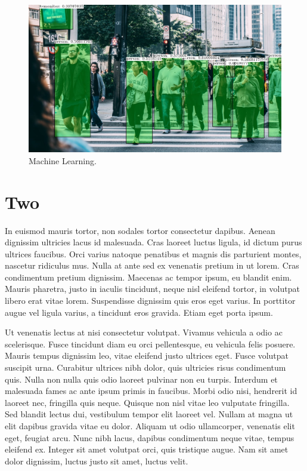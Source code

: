 \begin{spacing}{1.5}
\begin{figure}[ht]
\centering
\includegraphics[width=5in, fbox]{Chapter1/opencv.png}
\caption{Machine Learning.}
\label{fig:opencvexample} 
\end{figure}

\section{Two}
In euismod mauris tortor, non sodales tortor consectetur dapibus. Aenean dignissim ultricies lacus id malesuada. Cras laoreet luctus ligula, id dictum purus ultrices faucibus. Orci varius natoque penatibus et magnis dis parturient montes, nascetur ridiculus mus. Nulla at ante sed ex venenatis pretium in ut lorem. Cras condimentum pretium dignissim. Maecenas ac tempor ipsum, eu blandit enim. Mauris pharetra, justo in iaculis tincidunt, neque nisl eleifend tortor, in volutpat libero erat vitae lorem. Suspendisse dignissim quis eros eget varius. In porttitor augue vel ligula varius, a tincidunt eros gravida. Etiam eget porta ipsum.

Ut venenatis lectus at nisi consectetur volutpat. Vivamus vehicula a odio ac scelerisque. Fusce tincidunt diam eu orci pellentesque, eu vehicula felis posuere. Mauris tempus dignissim leo, vitae eleifend justo ultrices eget. Fusce volutpat suscipit urna. Curabitur ultrices nibh dolor, quis ultricies risus condimentum quis. Nulla non nulla quis odio laoreet pulvinar non eu turpis. Interdum et malesuada fames ac ante ipsum primis in faucibus. Morbi odio nisi, hendrerit id laoreet nec, fringilla quis neque. Quisque non nisl vitae leo vulputate fringilla. Sed blandit lectus dui, vestibulum tempor elit laoreet vel. Nullam at magna ut elit dapibus gravida vitae eu dolor. Aliquam ut odio ullamcorper, venenatis elit eget, feugiat arcu. Nunc nibh lacus, dapibus condimentum neque vitae, tempus eleifend ex. Integer sit amet volutpat orci, quis tristique augue. Nam sit amet dolor dignissim, luctus justo sit amet, luctus velit.


\end{spacing}
